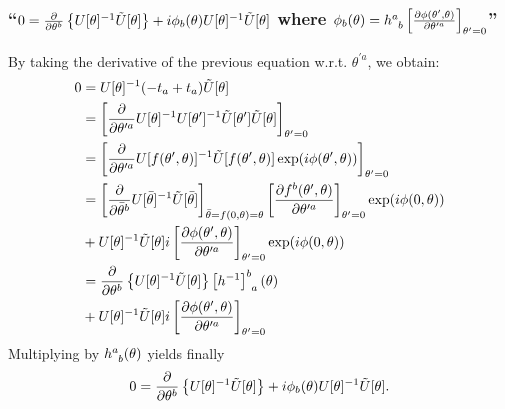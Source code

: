 \subsubsection{\enquote{$0=\partialderivative{}{\theta^b}\left\{U[\theta]^{-1}\tilde{U}[\theta]\right\}+i\phi_b(\theta) U[\theta]^{-1} \tilde{U}[\theta]$ where $\phi_b(\theta)=h^a_{\hphantom{a}b}\left[\partialderivative{\phi(\theta^\prime,\theta)}{\theta^{\prime a}}\right]_{\theta^\prime=0}$} }\label{sususec:2_B_p99_1}
By taking the derivative of the previous equation w.r.t. $\theta^{\prime a}$, we obtain:
\begin{align*} 
	0&=U[\theta]^{-1} (-t_a+t_a)\tilde{U}[\theta]\\
	&=\left[\partialderivative{}{\theta^{\prime a}}U[\theta]^{-1}U[\theta^\prime]^{-1}\tilde{U}[\theta^\prime]\tilde{U}[\theta]\right]_{\theta^\prime=0}\\
	&=\left[\partialderivative{}{\theta^{\prime a}}U[f(\theta^\prime,\theta)]^{-1}\tilde{U}[f(\theta^\prime,\theta)]\exp(i\phi(\theta^\prime,\theta))\right]_{\theta^\prime=0}\\
	&=\left[\partialderivative{}{\bar{\theta}^b}U[\bar{\theta}]^{-1} \tilde{U}[\bar{\theta}]\right]_{\bar{\theta}=f(0,\theta)=\theta} \left[\partialderivative{f^b(\theta^\prime,\theta)}{\theta^{\prime a}}\right]_{\theta^\prime=0}\exp(i\phi(0,\theta))\\
	&+U[\theta]^{-1}\tilde{U}[\theta]i \left[\partialderivative{\phi(\theta^\prime,\theta)}{\theta^{\prime a}}\right]_{\theta^\prime=0}\exp(i\phi(0,\theta))\\
	&=\partialderivative{}{\theta^b}\left\{U[\theta]^{-1}\tilde{U}[\theta]\right\}\left[h^{-1}\right]^b_{\hphantom{b}a}(\theta)\\
	&+U[\theta]^{-1}\tilde{U}[\theta]i \left[\partialderivative{\phi(\theta^\prime,\theta)}{\theta^{\prime a}}\right]_{\theta^\prime=0}
\end{align*}
Multiplying by $h^a_{\hphantom{a}b}(\theta)$ yields finally
\[0=\partialderivative{}{\theta^b}\left\{U[\theta]^{-1}\tilde{U}[\theta]\right\}+i\phi_b(\theta) U[\theta]^{-1} \tilde{U}[\theta].\]

